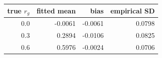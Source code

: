 \begin{tabular}{rrrr}
\toprule
true $r_g$ & fitted mean & bias & empirical SD \\
\midrule
0.0 & -0.0061 & -0.0061 & 0.0798 \\
0.3 & 0.2894 & -0.0106 & 0.0825 \\
0.6 & 0.5976 & -0.0024 & 0.0706 \\
\bottomrule
\end{tabular}
